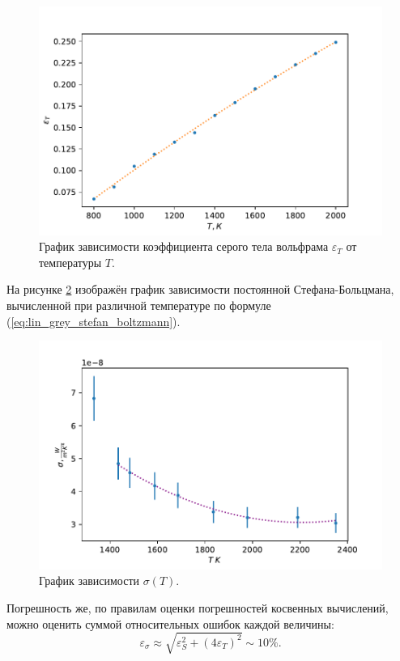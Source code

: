 \documentclass[10pt,a4paper]{article}
\begin{document}
\begin{multicols}{2}
	\begin{figure}[H]
		\includegraphics[width=1\textwidth]{gen/fig-epsilon.pdf}
		\caption{График зависимости коэффициента серого тела вольфрама $\varepsilon_T$ от температуры $T$.}
		\label{fig:epsilon_T}
	\end{figure}	 
	
	На рисунке \ref{fig:sigma} изображён график зависимости постоянной Стефана-Больцмана, вычисленной при различной температуре по формуле (\ref{eq:lin_grey_stefan_boltzmann}).
	
	
	\begin{figure}[H]
		\includegraphics[width=1\textwidth]{gen/fig-sigma.pdf}
		\caption{График зависимости $\sigma(T)$.}
		\label{fig:sigma}
	\end{figure}	 
	
	Погрешность же, по правилам оценки погрешностей косвенных вычислений, можно оценить суммой относительных ошибок каждой величины:
	$$\varepsilon_\sigma \approx \sqrt{\varepsilon_S^2 + (4\varepsilon_T)^2} \sim 10 \%. $$\\


\end{multicols}
\end{document}
